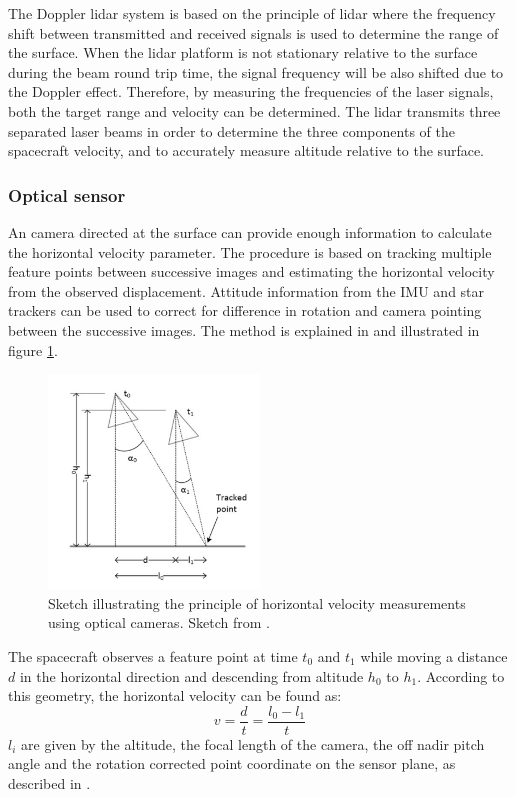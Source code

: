 The Doppler lidar system is based on the principle of lidar where the frequency shift between transmitted and received signals is used to determine the range of the surface. When the lidar platform is not stationary relative to the surface during the  beam round trip time, the signal frequency will be also shifted due to the Doppler effect. Therefore, by measuring the frequencies of the laser signals, both the target range and velocity can be
determined. The lidar transmits three separated laser beams in order to determine the three components of the spacecraft velocity, and to accurately measure altitude relative to the surface. 
  
\subsubsection{Optical sensor}
An camera directed at the surface can provide enough information to calculate the horizontal velocity parameter. The procedure is based on tracking multiple feature points between successive images and estimating the horizontal velocity from the observed displacement. Attitude information from the IMU and star trackers can be used to correct for difference in rotation and camera pointing between the successive images. The method is explained in \cite{alessandro} and illustrated in figure \ref{horvel}.

\begin{figure}[htb]
\begin{center}
\includegraphics[width=0.5\textwidth]{figures/navtheory/horvel}
\caption{Sketch illustrating the principle of horizontal velocity measurements using optical cameras. Sketch from \cite{alessandro}.}
\label{horvel}
\end{center}
\end{figure}

\noindent
The spacecraft observes a feature point at time $t_0$ and $t_1$ while moving a distance $d$ in the horizontal direction and descending from altitude $h_0$ to $h_1$. According to this geometry, the horizontal velocity can be found as:
\begin{equation}
v=\dfrac{d}{t}=\dfrac{l_0-l_1}{t}
\end{equation}
$l_i$ are given by the altitude, the focal length of the camera, the off nadir pitch angle and the rotation corrected point coordinate on the sensor plane, as described in \cite{alessandro}.


